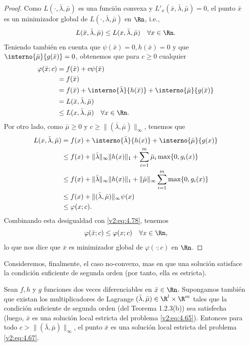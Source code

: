 \begin{proof}
    Como $L(\cdot, \bar{\lambda}, \bar{\mu})$ es una función convexa y $L'_x(\bar{x}, \bar{\lambda}, \bar{\mu}) = 0$, el punto $\bar{x}$ es un minimizador global de $L(\cdot, \bar{\lambda}, \bar{\mu})$ en $\Rn$, i.e.,
    \[
        L(\bar{x}, \bar{\lambda}, \bar{\mu}) \le L(x, \bar{\lambda}, \bar{\mu}) \quad \forall x \in \Rn.
    \]
    Teniendo también en cuenta que $\psi(\bar{x}) = 0, h(\bar{x}) = 0$ y que $\interno{\bar{\mu}}{g(\bar{x})} = 0$, obtenemos que para $c \ge 0$ cualquier
    \begin{align}
        \varphi(\bar{x}; c) &= f(\bar{x}) + c\psi(\bar{x}) \nonumber \\
        &= f(\bar{x}) \nonumber \\
        &= f(\bar{x}) + \interno{\bar{\lambda}}{h(\bar{x})} + \interno{\bar{\mu}}{g(\bar{x})} \nonumber \\
        &= L(\bar{x}, \bar{\lambda}, \bar{\mu}) \nonumber \\
        &\le L(x, \bar{\lambda}, \bar{\mu}) \quad \forall x \in \Rn. \label{v2:eq:4.78}
    \end{align}
    Por otro lado, como $\bar{\mu} \ge 0$ y $c \ge \|(\bar{\lambda}, \bar{\mu})\|_\infty$, tenemos que
    \begin{align*}
        L(x, \bar{\lambda}, \bar{\mu}) &= f(x) + \interno{\bar{\lambda}}{h(x)} + \interno{\bar{\mu}}{g(x)} \\
        &\le f(x) + \|\bar{\lambda}\|_\infty \|h(x)\|_1 + \sum_{i=1}^m \bar{\mu}_i \max\{0, g_i(x)\} \\
        &\le f(x) + \|\bar{\lambda}\|_\infty \|h(x)\|_1 + \|\bar{\mu}\|_\infty \sum_{i=1}^m \max\{0, g_i(x)\} \\
        &\le f(x) + \|(\bar{\lambda}, \bar{\mu})\|_\infty \psi(x) \\
        &\le \varphi(x; c).
    \end{align*}
    Combinando esta desigualdad con \eqref{v2:eq:4.78}, tenemos
    \[
        \varphi(\bar{x}; c) \le \varphi(x; c) \quad \forall x \in \Rn,
    \]
    lo que nos dice que $\bar{x}$ es minimizador global de $\varphi(\cdot; c)$ en $\Rn$.
\end{proof}

Consideremos, finalmente, el caso no-convexo, mas en que una solución satisface la condición suficiente de segunda orden (por tanto, ella es estricta).

\begin{theorem}\label{v2:thm:4.3.6}
    Sean $f, h$ y $g$ funciones dos veces diferenciables en $\bar{x} \in \Rn$. Supongamos también que existan los multiplicadores de Lagrange $(\bar{\lambda}, \bar{\mu}) \in \R^l \times \R^m$ tales que la condición suficiente de segunda orden (del Teorema 1.2.3(b)) sea satisfecha (luego, $\bar{x}$ es una solución local estricta del problema \eqref{v2:eq:4.65}).
    Entonces para todo $c > \|(\bar{\lambda}, \bar{\mu})\|_\infty$, el punto $\bar{x}$ es una solución local estricta del problema \eqref{v2:eq:4.67}.
\end{theorem}

